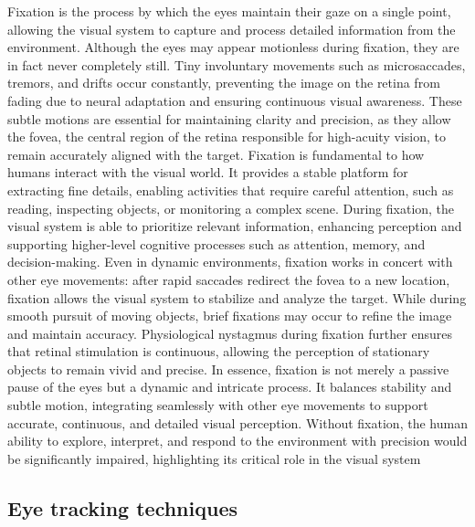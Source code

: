 \documentclass{article}
\begin{document}
Fixation is the process by which the eyes maintain their gaze on a single point, allowing the visual system to capture and process detailed information from the environment.
Although the eyes may appear motionless during fixation, they are in fact never completely still.
Tiny involuntary movements such as microsaccades, tremors, and drifts occur constantly, preventing the image on the retina from fading due to neural adaptation and ensuring continuous visual awareness. 
These subtle motions are essential for maintaining clarity and precision, as they allow the fovea, the central region of the retina responsible for high-acuity vision, to remain accurately aligned with the target.
Fixation is fundamental to how humans interact with the visual world.
It provides a stable platform for extracting fine details, enabling activities that require careful attention, such as reading, inspecting objects, or monitoring a complex scene.
During fixation, the visual system is able to prioritize relevant information, enhancing perception and supporting higher-level cognitive processes such as attention, memory, and decision-making.
Even in dynamic environments, fixation works in concert with other eye movements: after rapid saccades redirect the fovea to a new location, fixation allows the visual system to stabilize and analyze the target.
While during smooth pursuit of moving objects, brief fixations may occur to refine the image and maintain accuracy.
Physiological nystagmus during fixation further ensures that retinal stimulation is continuous, allowing the perception of stationary objects to remain vivid and precise.
In essence, fixation is not merely a passive pause of the eyes but a dynamic and intricate process.
It balances stability and subtle motion, integrating seamlessly with other eye movements to support accurate, continuous, and detailed visual perception.
Without fixation, the human ability to explore, interpret, and respond to the environment with precision would be significantly impaired, highlighting its critical role in the visual system

\subsection{Eye tracking techniques}
\end{document}

